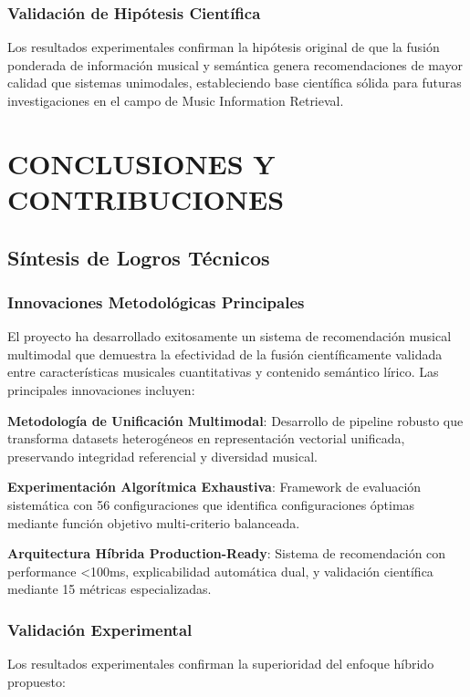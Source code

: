 \documentclass[12pt,a4paper]{report}
\begin{document}
\subsection{Validación de Hipótesis Científica}

Los resultados experimentales confirman la hipótesis original de que la fusión ponderada de información musical y semántica genera recomendaciones de mayor calidad que sistemas unimodales, estableciendo base científica sólida para futuras investigaciones en el campo de Music Information Retrieval.

\chapter{CONCLUSIONES Y CONTRIBUCIONES}

\section{Síntesis de Logros Técnicos}

\subsection{Innovaciones Metodológicas Principales}

El proyecto ha desarrollado exitosamente un sistema de recomendación musical multimodal que demuestra la efectividad de la fusión científicamente validada entre características musicales cuantitativas y contenido semántico lírico. Las principales innovaciones incluyen:

\textbf{Metodología de Unificación Multimodal}: Desarrollo de pipeline robusto que transforma datasets heterogéneos en representación vectorial unificada, preservando integridad referencial y diversidad musical.

\textbf{Experimentación Algorítmica Exhaustiva}: Framework de evaluación sistemática con 56 configuraciones que identifica configuraciones óptimas mediante función objetivo multi-criterio balanceada.

\textbf{Arquitectura Híbrida Production-Ready}: Sistema de recomendación con performance <100ms, explicabilidad automática dual, y validación científica mediante 15 métricas especializadas.

\subsection{Validación Experimental}

Los resultados experimentales confirman la superioridad del enfoque híbrido propuesto:
\end{document}
